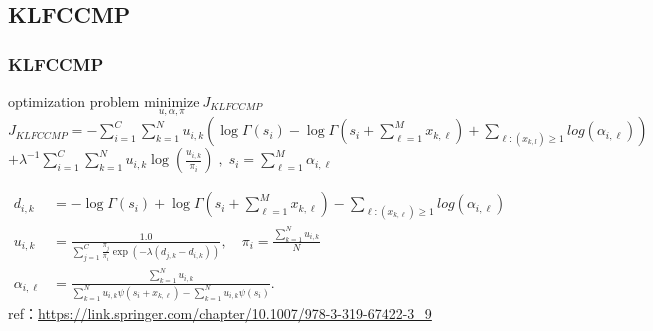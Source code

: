 \documentclass[fleqn,dvipdfmx,10pt]{beamer}
\begin{document}
\subsection{KLFCCMP}
\begin{frame}\frametitle{KLFCCMP}
  \begin{block}{optimization problem}
    $\underset{u,\alpha,\pi}{\text{minimize}}~J_{KLFCCMP}$\\
    $J_{KLFCCMP}=-\sum_{i=1}^C\sum_{k=1}^N u_{i,k} \left(\log\Gamma(s_i)-\log\Gamma(s_i+\sum_{\ell=1}^M x_{k,\ell})+\sum_{\ell:(x_{k,l})\geq1} log(\alpha_{i,\ell})\right)$\\$+\lambda^{-1}\sum_{i=1}^C\sum_{k=1}^N u_{i,k}\log(\frac{u_{i,k}}{\pi_i})\;,\;s_i=\sum_{\ell=1}^M \alpha_{i,\ell}$\centering 	%
  \end{block}
  \begin{align*}
    d_{i,k}&=-\log\Gamma(s_i)+\log\Gamma(s_i+\sum_{\ell=1}^M x_{k,\ell})-\sum_{\ell:(x_{k,\ell})\geq1} log(\alpha_{i,\ell})\\
    u_{i,k}&=\frac{1.0}{\sum_{j=1}^C \frac{\pi_{j}}{\pi_i}\exp(-\lambda(d_{j,k}-d_{i,k}))},\quad
    \pi_i=\frac{\sum_{k=1}^N u_{i,k}}{N}\\
    \alpha_{i,\ell}&=\frac{\sum_{k=1}^N u_{i,k}}{\sum_{k=1}^N u_{i,k} \psi(s_i+x_{k,\ell})-\sum_{k=1}^N u_{i,k}\psi(s_i)}.
  \end{align*}
   ref：\url{https://link.springer.com/chapter/10.1007/978-3-319-67422-3_9}
\end{frame}
\end{document}
